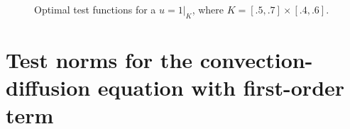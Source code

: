 \begin{figure}
\centering
{}
\caption{Optimal test functions for a $u=\left.1\right|_K$, where $K = [.5,.7]\times[.4,.6]$.}
\end{figure}

\section{Test norms for the convection-diffusion equation with first-order term}

